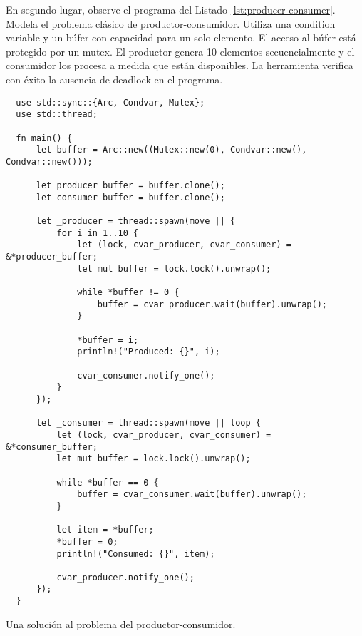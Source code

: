 En segundo lugar, observe el programa del Listado \ref{lst:producer-consumer}.
Modela el problema clásico de productor-consumidor.
Utiliza una condition variable y un búfer con capacidad para un solo elemento.
El acceso al búfer está protegido por un mutex. El productor genera 10 elementos
secuencialmente y el consumidor los procesa a medida que están disponibles. La herramienta
verifica con éxito la ausencia de deadlock en el programa.

\begin{listing}[!htbp]
    \begin{verbatim}
  use std::sync::{Arc, Condvar, Mutex};
  use std::thread;
  
  fn main() {
      let buffer = Arc::new((Mutex::new(0), Condvar::new(), Condvar::new()));
  
      let producer_buffer = buffer.clone();
      let consumer_buffer = buffer.clone();
  
      let _producer = thread::spawn(move || {
          for i in 1..10 {
              let (lock, cvar_producer, cvar_consumer) = &*producer_buffer;
              let mut buffer = lock.lock().unwrap();
  
              while *buffer != 0 {
                  buffer = cvar_producer.wait(buffer).unwrap();
              }
  
              *buffer = i;
              println!("Produced: {}", i);
  
              cvar_consumer.notify_one();
          }
      });
  
      let _consumer = thread::spawn(move || loop {
          let (lock, cvar_producer, cvar_consumer) = &*consumer_buffer;
          let mut buffer = lock.lock().unwrap();
  
          while *buffer == 0 {
              buffer = cvar_consumer.wait(buffer).unwrap();
          }
  
          let item = *buffer;
          *buffer = 0;
          println!("Consumed: {}", item);
  
          cvar_producer.notify_one();
      });
  }
  \end{verbatim}
    \caption{Una solución al problema del productor-consumidor.}
    \label{lst:producer-consumer}
\end{listing}